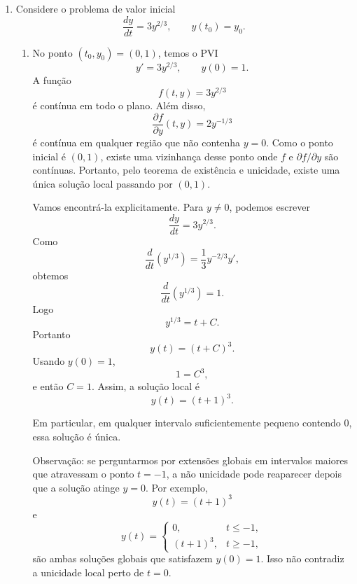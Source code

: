 \documentclass[a4paper,11pt,reqno]{amsart}
\begin{document}
\begin{enumerate}
\begin{enumerate}
Podemos reescrever a equação como
\[
    y'=1+\frac{y}{t}.
\]
A expressão $\frac{y}{t}$ sugere a mudança de variável
\[
    z(t)=\frac{y(t)}{t},
    \qquad\text{isto é,}\qquad
    y(t)=tz(t).
\]
Então
\[
    y'(t)=z(t)+tz'(t).
\]
Substituindo na equação,
\[
    z+tz'=1+z.
\]
Cancelando $z$ dos dois lados,
\[
    tz'=1.
\]
Como $t>0$,
\[
    z'=\frac{1}{t}.
\]
Integrando,
\[
    z(t)=\ln t+C.
\]
Logo
\[
    y(t)=t(\ln t+C).
\]
Usando $y(1)=0$,
\[
    0=1(\ln 1+C)=C.
\]
Portanto
\[
    \boxed{y(t)=t\ln t.}
\]
Como a própria equação só está considerada para $t>0$, e a solução está definida em todo esse intervalo, o maior intervalo de existência contendo $1$ é
\[
    \boxed{(0,+\infty).}
\]

\end{enumerate}


\item Considere o problema de valor inicial
\[
    \frac{dy}{dt}=3y^{2/3},
    \qquad
    y(t_0)=y_0.
\]

\begin{enumerate}

\item No ponto $(t_0,y_0)=(0,1)$, temos o PVI
\[
    y'=3y^{2/3},
    \qquad
    y(0)=1.
\]
A função
\[
    f(t,y)=3y^{2/3}
\]
é contínua em todo o plano. Além disso,
\[
    \frac{\partial f}{\partial y}(t,y)=2y^{-1/3}
\]
é contínua em qualquer região que não contenha $y=0$. Como o ponto inicial é $(0,1)$, existe uma vizinhança desse ponto onde $f$ e $\partial f/\partial y$ são contínuas. Portanto, pelo teorema de existência e unicidade, existe uma única solução local passando por $(0,1)$.

Vamos encontrá-la explicitamente. Para $y\neq 0$, podemos escrever
\[
    \frac{dy}{dt}=3y^{2/3}.
\]
Como
\[
    \frac{d}{dt}\left(y^{1/3}\right)
    =
    \frac{1}{3}y^{-2/3}y',
\]
obtemos
\[
    \frac{d}{dt}\left(y^{1/3}\right)=1.
\]
Logo
\[
    y^{1/3}=t+C.
\]
Portanto
\[
    y(t)=(t+C)^3.
\]
Usando $y(0)=1$,
\[
    1=C^3,
\]
e então $C=1$. Assim, a solução local é
\[
    \boxed{y(t)=(t+1)^3.}
\]

Em particular, em qualquer intervalo suficientemente pequeno contendo $0$, essa solução é única.

Observação: se perguntarmos por extensões globais em intervalos maiores que atravessam o ponto $t=-1$, a não unicidade pode reaparecer depois que a solução atinge $y=0$. Por exemplo,
\[
    y(t)=(t+1)^3
\]
e
\[
    y(t)=
    \begin{cases}
        0, & t\leq -1,\\
        (t+1)^3, & t\geq -1,
    \end{cases}
\]
são ambas soluções globais que satisfazem $y(0)=1$. Isso não contradiz a unicidade local perto de $t=0$.


\end{enumerate}
\end{enumerate}
\end{document}

